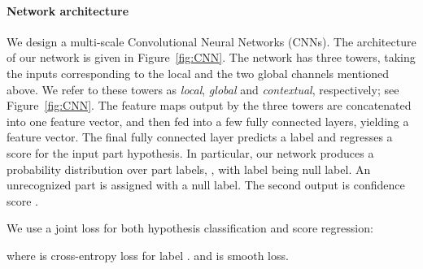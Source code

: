 \documentclass[acmtog]{acmart}
\newcommand{\new}[1]{{\color{black}#1}}
\begin{document}
\paragraph{\textbf{Network architecture}}
We design a multi-scale Convolutional Neural Networks (CNNs).
The architecture of our network is given in Figure~\ref{fig:CNN}.
The network has three towers, taking the inputs corresponding to
the local and the two global channels mentioned above.
We refer to these towers as \emph{local}, \emph{global} and \emph{contextual}, respectively;
see Figure~\ref{fig:CNN}.
The feature maps output by the three towers are concatenated into one feature vector,
and then fed into a few fully connected layers, yielding a  feature vector.
The final fully connected layer predicts
a label and regresses a score for the input part hypothesis.
In particular, our network produces a probability distribution over  part labels, ,
with label  being null label.
An unrecognized part is assigned with a null label.
The second output is confidence score .
\new{
We use a joint loss  for both hypothesis classification and score regression:

where  is cross-entropy loss for label .
and  is smooth  loss.
}
\end{document}

